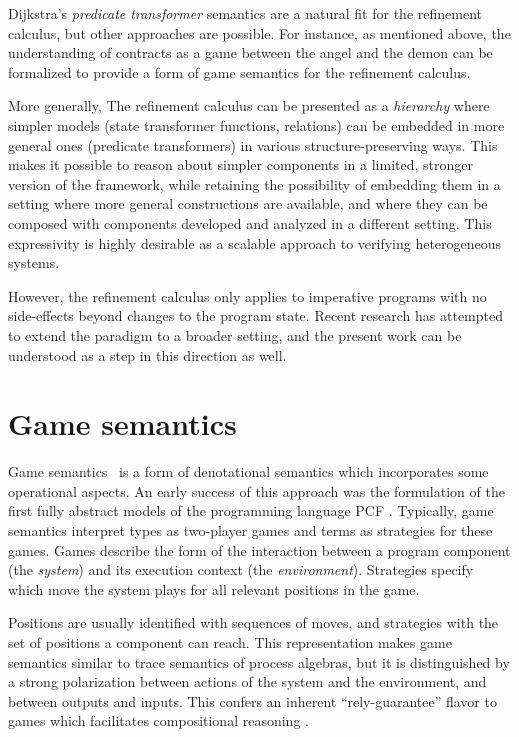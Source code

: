 \documentclass[11pt,oneside,draft]{book}
\theoremstyle{definition}
\begin{document}
Dijkstra's \emph{predicate transformer} semantics \citep{gc}
are a natural fit for the refinement calculus,
but other approaches are possible.
For instance,
as mentioned above,
the understanding of contracts as a game between
the angel and the demon
can be formalized to provide a form of
game semantics for the refinement calculus.

More generally,
The refinement calculus can be presented as a \emph{hierarchy}
where simpler models (state transformer functions, relations)
can be embedded in more general ones (predicate transformers)
in various structure-preserving ways.
This makes it possible to reason about simpler components
in a limited, stronger version of the framework,
while retaining the possibility of embedding them
in a setting
where more general constructions are available,
and where they can be composed with components
developed and analyzed in a different setting.
This expressivity is highly desirable
as a scalable approach to
verifying heterogeneous systems.

However,
the refinement calculus only applies to imperative programs
with no side-effects beyond changes to the program state.
Recent research has attempted to extend the paradigm
to a broader setting,
and the present work can be understood
as a step in this direction as well.



\section{Game semantics} \label{sec:bg:gamesem} %


Game semantics~\citep{gsll,gamesem99}
is a form of denotational semantics which
incorporates some operational aspects.
An early success of this approach was
the formulation of the first fully abstract models
of the programming language PCF \citep{pcfajm,pcfho}.
Typically,
game semantics interpret
types as two-player games
and terms as strategies for these games.
Games describe the form of the interaction
between a program component %
(the \emph{system})
and its execution context
(the \emph{environment}).
Strategies
specify which move the system plays
for all relevant positions in the game.

Positions are usually identified with sequences of moves,
and strategies with the set of positions
a component can reach.
This representation makes
game semantics similar to
trace semantics of process algebras,
but it is distinguished
by a strong polarization between
actions of the system and the environment,
and between outputs and inputs.
This confers an inherent ``rely-guarantee'' flavor
to games which facilitates compositional reasoning
\citep{cspgs}.
\end{document}
